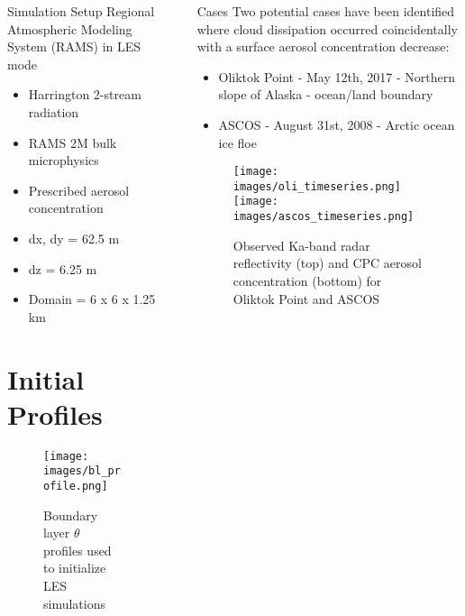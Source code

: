 \documentclass[final]{beamer}
\newlength{\sepwid}
\newlength{\onecolwid}
\newlength{\twocolwid}
\begin{document}
\begin{frame}[t]
\begin{columns}[t]
\begin{column}{\onecolwid}
	\begin{block}{Simulation Setup}
		Regional Atmospheric Modeling System (RAMS) in LES mode
		\begin{itemize}
			\item Harrington 2-stream radiation
			\item RAMS 2M bulk microphysics
			\item Prescribed aerosol concentration
			\item dx, dy = 62.5 m
			\item dz = 6.25 m
			\item Domain = 6 x 6 x 1.25 km
		\end{itemize}
		\section{Initial Profiles}
		\begin{figure}
			\centering
			\texttt{[image: images/bl\_profile.png]}
			\caption{Boundary layer $\theta$ profiles used to initialize LES simulations}
		\end{figure}
	\end{block}

\end{column} %

\begin{column}{\sepwid}\end{column} %

\begin{column}{\twocolwid}
	\begin{block}{Cases}
			Two potential cases have been identified where cloud dissipation occurred coincidentally with a surface aerosol concentration decrease:
			\begin{itemize}
				\item Oliktok Point - May 12th, 2017 - Northern slope of Alaska - ocean/land boundary
				\item ASCOS - August 31st, 2008 - Arctic ocean ice floe
			\end{itemize}
			
			\begin{figure}
				\centering
				\texttt{[image: images/oli\_timeseries.png]}
				\texttt{[image: images/ascos\_timeseries.png]}
				\caption{Observed Ka-band radar reflectivity (top) and CPC aerosol concentration (bottom) for Oliktok Point and ASCOS}
			\end{figure}	
	\end{block}


\end{column}
\end{columns}
\end{frame}
\end{document}
